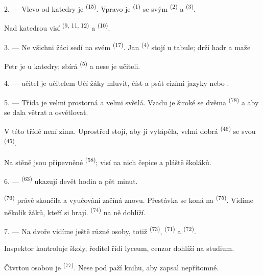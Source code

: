 2. --- Vlevo od katedry je  \textsuperscript{(15)}. Vpravo je
 \textsuperscript{(1)} se svým  \textsuperscript{(2)} a
 \textsuperscript{(3)}.

Nad katedrou visí  \textsuperscript{(9, 11, 12)} a
 \textsuperscript{(10)}.

3. --- Ne všichni žáci sedí na svém  \textsuperscript{(17)}. Jan
\textsuperscript{(4)} stojí u tabule; drží  hadr a maže

Petr je u katedry; sbírá  \textsuperscript{(5)} a nese je učiteli.

4. ---  učitel je učitelem  Učí žáky mluvit, číst a psát
cizími jazyky  nebo
.

5. --- Třída je velmi prostorná a velmi světlá. Vzadu je široké  se dvěma
 \textsuperscript{(78)} a  aby se dala větrat a
osvětlovat.

V této třídě není zima. Uprostřed stojí, aby ji vytápěla, velmi dobrá 
\textsuperscript{(46)} se svou  \textsuperscript{(45)}.

Na stěně jsou připevněné  \textsuperscript{(58)}; visí na nich čepice a pláště
školáků.

\VUsaut{5.2mm}
\VUsaut{3.6mm}

6. ---  \textsuperscript{(63)} ukazují devět hodin a pět minut.

 \textsuperscript{(76)} právě skončila a vyučování začíná znovu.
Přestávka se koná na  \textsuperscript{(75)}. Vidíme několik žáků, kteří si
hrají.  \textsuperscript{(74)} na ně dohlíží.

7. --- Na dvoře vidíme ještě různé osoby, totiž  \textsuperscript{(73)},
 \textsuperscript{(71)} a  \textsuperscript{(72)}.

Inspektor kontroluje školy, ředitel řídí lyceum, cenzor dohlíží na studium.

Čtvrtou osobou je  \textsuperscript{(77)}. Nese pod paží knihu, aby zapsal
nepřítomné.

